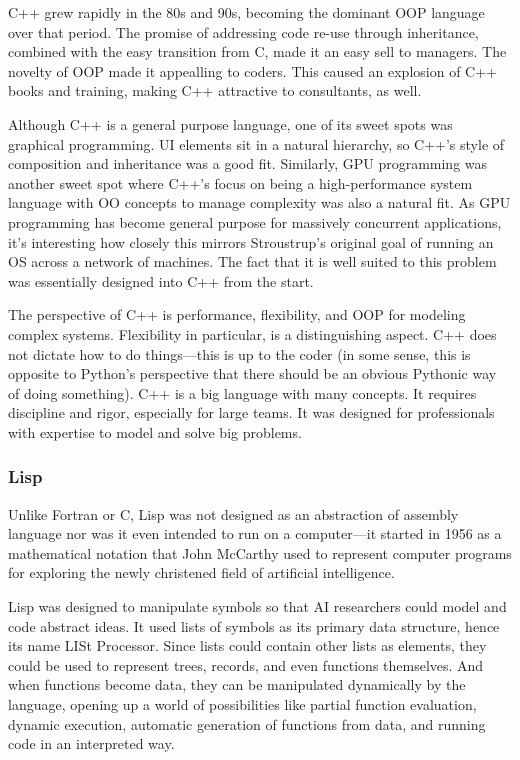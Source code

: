 C++ grew rapidly in the 80s and 90s, becoming the dominant OOP language over
that period. The promise of addressing code re-use through inheritance,
combined with the easy transition from C, made it an easy sell to managers. The
novelty of OOP made it appealling to coders. This caused an explosion of C++
books and training, making C++ attractive to consultants, as well.

Although C++ is a general purpose language, one of its sweet spots was
graphical programming. UI elements sit in a natural hierarchy, so C++'s style
of composition and inheritance was a good fit. Similarly, GPU programming was
another sweet spot where C++'s focus on being a high-performance system
language with OO concepts to manage complexity was also a natural fit. As GPU
programming has become general purpose for massively concurrent applications,
it's interesting how closely this mirrors Stroustrup's original goal of running
an OS across a network of machines. The fact that it is well suited to this
problem was essentially designed into C++ from the start.

The perspective of C++ is performance, flexibility, and OOP for modeling
complex systems. Flexibility in particular, is a distinguishing aspect. C++
does not dictate how to do things---this is up to the coder (in some sense,
this is opposite to Python's perspective that there should be an obvious
Pythonic way of doing something). C++ is a big language with many concepts. It
requires discipline and rigor, especially for large teams. It was designed for
professionals with expertise to model and solve big problems. 


\subsubsection{Lisp}

Unlike Fortran or C, Lisp was not designed as an abstraction of assembly
language nor was it even intended to run on a computer---it started in 1956 as
a mathematical notation that John McCarthy used to represent computer programs
for exploring the newly christened field of artificial intelligence.

Lisp was designed to manipulate symbols so that AI researchers could model and
code abstract ideas. It used lists of symbols as its primary data structure,
hence its name LISt Processor. Since lists could contain other lists as
elements, they could be used to represent trees, records, and even functions
themselves. And when functions become data, they can be manipulated dynamically
by the language, opening up a world of possibilities like partial function
evaluation, dynamic execution, automatic generation of functions from data, and
running code in an interpreted way.

